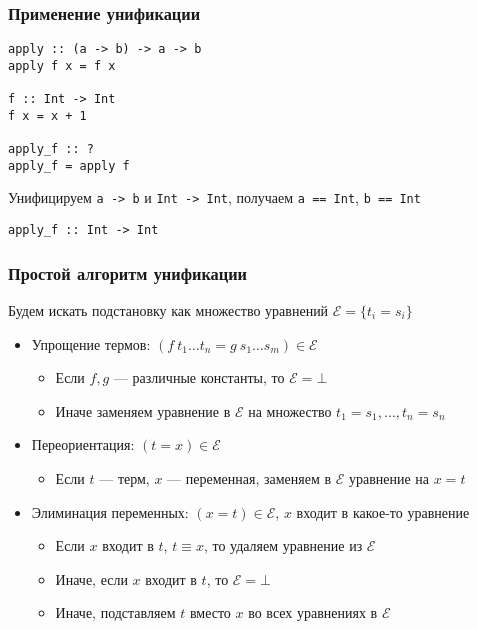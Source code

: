 \documentclass{beamer}
\begin{document}
\begin{frame}[fragile]
  \frametitle{Применение унификации}
\begin{verbatim}
apply :: (a -> b) -> a -> b
apply f x = f x

f :: Int -> Int
f x = x + 1

apply_f :: ?
apply_f = apply f
\end{verbatim}

\bigskip

Унифицируем \verb!a -> b! и \verb!Int -> Int!, получаем \verb!a == Int!, \verb!b == Int!

\bigskip

\verb!apply_f :: Int -> Int!
\end{frame}



\begin{frame}[fragile]
  \frametitle{Простой алгоритм унификации}

\begin{center}
  Будем искать подстановку как множество уравнений $\mathcal{E} = \{ t_i = s_i \}$
\end{center}

\begin{itemize}
  \item Упрощение термов: $(f \ t_1 \dots t_n = g \ s_1 \dots s_m) \in \mathcal{E}$
  \begin{itemize}
    \item Если $f, g$ --- различные константы, то $\mathcal{E} = \bot$
    \item Иначе заменяем уравнение в $\mathcal{E}$ на множество $t_1 = s_1, \dots, t_n = s_n$
  \end{itemize}
  \item Переориентация: $(t = x) \in \mathcal{E}$
  \begin{itemize}
    \item Если $t$ --- терм, $x$ --- переменная, заменяем в $\mathcal{E}$ уравнение на $x = t$
  \end{itemize}
  \item Элиминация переменных: $(x = t) \in \mathcal{E}$, $x$ входит в какое-то уравнение
  \begin{itemize}
    \item Если $x$ входит в $t$, $t \equiv x$, то удаляем уравнение из $\mathcal{E}$
    \item Иначе, если $x$ входит в $t$, то $\mathcal{E} = \bot$
    \item Иначе, подставляем $t$ вместо $x$ во всех уравнениях в $\mathcal{E}$
  \end{itemize}
\end{itemize}

\end{frame}
\end{document}
